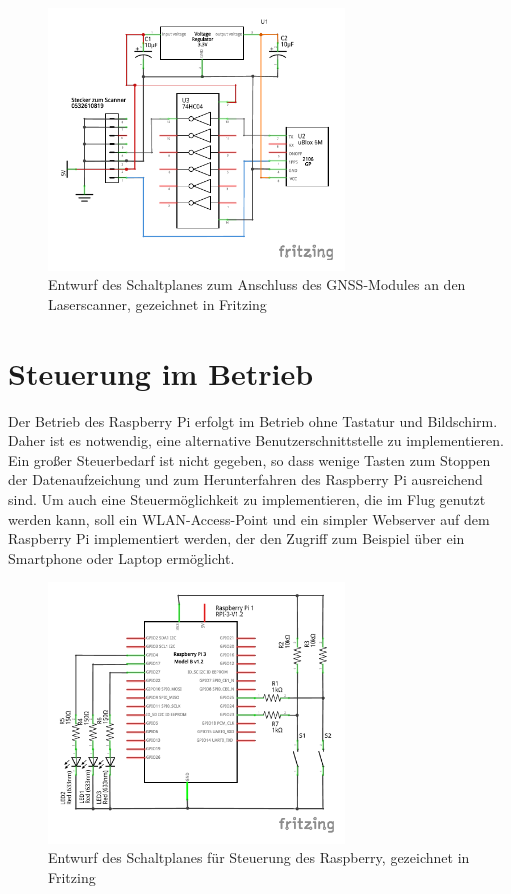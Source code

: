 \documentclass[a4paper,12pt,bibliography=totoc, listof=totoc,titlepage,pointlessnumbers]{scrreprt}
\begin{document}
\begin{figure}[ht!]
 \centering
 \includegraphics[width=0.7\textwidth]{img/GPS_Schaltung.pdf}
 \caption{Entwurf des Schaltplanes zum Anschluss des GNSS-Modules an den Laserscanner, gezeichnet in Fritzing}
 \label{abb:schaltplan}
\end{figure}

\section{Steuerung im Betrieb}
\label{s:steuermodul}
Der Betrieb des Raspberry Pi erfolgt im Betrieb ohne Tastatur und Bildschirm. Daher ist es notwendig, eine alternative Benutzerschnittstelle zu implementieren. Ein großer Steuerbedarf ist nicht gegeben, so dass wenige Tasten zum Stoppen der Datenaufzeichung und zum Herunterfahren des Raspberry Pi ausreichend sind. Um auch eine Steuermöglichkeit zu implementieren, die im Flug genutzt werden kann, soll ein WLAN-Access-Point und ein simpler Webserver auf dem Raspberry Pi implementiert werden, der den Zugriff zum Beispiel über ein Smartphone oder Laptop ermöglicht.

\begin{figure}[ht!]
 \centering
 \includegraphics[width=0.7\textwidth]{img/steuerung.pdf}
 \caption{Entwurf des Schaltplanes für Steuerung des Raspberry, gezeichnet in Fritzing}
 \label{abb:steuerung}
\end{figure}
\end{document}
